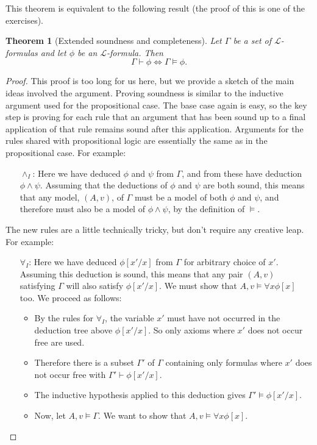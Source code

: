 \documentclass{article}
\theoremstyle{plain}
\newtheorem{theorem}{Theorem}[section]{\bfseries}{\itshape}
\newcommand{\sL}{\mathscr{L}}
\begin{document}
This theorem is equivalent to the following result (the proof of this is one of the exercises).

\begin{theorem}[Extended soundness and completeness]\label{T:G2}
Let $\Gamma$ be a set of $\sL$-formulas and let $\phi$ be an $\sL$-formula. Then
\[\Gamma\vdash \phi\iff \Gamma\models \phi.\]
\end{theorem}
\begin{proof}
This proof is too long for us here, but we provide a sketch of the main ideas involved the argument. Proving soundness is similar to the inductive argument used for the propositional case. The base case again is easy, so the key step is proving for each rule that an argument that has been sound up to a final application of that rule remains sound after this application.  Arguments for the rules shared with propositional logic are essentially the same as in the propositional case. For example:
\begin{itemize}
\item[$\wedge_I$:] Here we have deduced $\phi$ and $\psi$ from $\Gamma$, and from these have deduction $\phi\wedge \psi$. Assuming that the deductions of $\phi$ and $\psi$ are both sound, this means that any model, $(A,v)$, of $\Gamma$ must be a model of both $\phi$ and $\psi$, and therefore must also be a model of $\phi\wedge \psi$, by the definition of $\models$.
\end{itemize}
The new rules are a little technically tricky, but don't require any creative leap.  For example:
\begin{itemize}
\item[$\forall_I$:] Here we have deduced $\phi[x'/x]$ from $\Gamma$ for arbitrary choice of $x'$. Assuming this deduction is sound, this means that any pair $(A,v)$ satisfying $\Gamma$ will also satisfy $\phi[x'/x]$. We must show that $A,v\models \forall x \phi[x]$ too. We proceed as follows:
\begin{itemize}
\item By the rules for $\forall_I$, the variable $x'$ must have not occurred in the deduction tree above $\phi[x'/x]$. So only axioms where $x'$ does not occur free are used. 
\item Therefore there is a subset $\Gamma'$ of $\Gamma$ containing only formulas where $x'$ does not occur free with $\Gamma'\vdash \phi[x'/x]$.
\item The inductive hypothesis applied to this deduction gives $\Gamma'\models \phi[x'/x]$.
\item Now, let $A,v\models \Gamma$. We want to show that $A,v\models \forall x \phi[x]$.

\end{itemize}
\end{itemize}
\end{proof}
\end{document}
